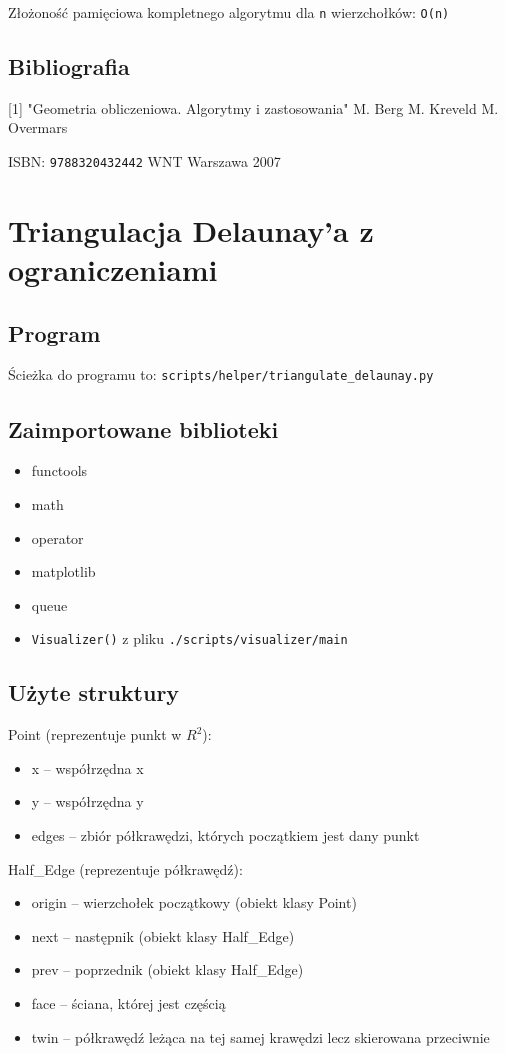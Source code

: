 \documentclass[12pt]{article}
\begin{document}
Złożoność pamięciowa kompletnego algorytmu dla \verb|n| wierzchołków: \verb|O(n)|


\subsection*{Bibliografia}
[1] \quad "Geometria obliczeniowa. Algorytmy i zastosowania" \quad M. Berg M. Kreveld M. Overmars

\quad\quad ISBN: \verb|9788320432442| WNT Warszawa 2007

\newpage

\section*{Triangulacja Delaunay'a z ograniczeniami}
\subsection*{Program}
Ścieżka do programu to: \verb|scripts/helper/triangulate_delaunay.py|
\subsection*{Zaimportowane biblioteki}
\begin{itemize}[noitemsep]
	\item functools
	\item math
	\item operator
	\item matplotlib
	\item queue
	\item \verb|Visualizer()| z pliku \verb|./scripts/visualizer/main|
\end{itemize}

\subsection*{Użyte struktury}
Point (reprezentuje punkt w $R^2$):
\begin{itemize}[noitemsep]
	\item x – współrzędna x 
	\item y – współrzędna y
	\item edges – zbiór półkrawędzi, których początkiem jest dany punkt
\end{itemize}

\mbox{}\newline
Half\_Edge (reprezentuje półkrawędź):
\begin{itemize}[noitemsep]
	\item origin – wierzchołek początkowy (obiekt klasy Point)
	\item next – następnik (obiekt klasy Half\_Edge)
	\item prev – poprzednik (obiekt klasy Half\_Edge)
	\item face – ściana, której jest częścią
	\item twin – półkrawędź leżąca na tej samej krawędzi lecz skierowana przeciwnie
\end{itemize}
\end{document}
